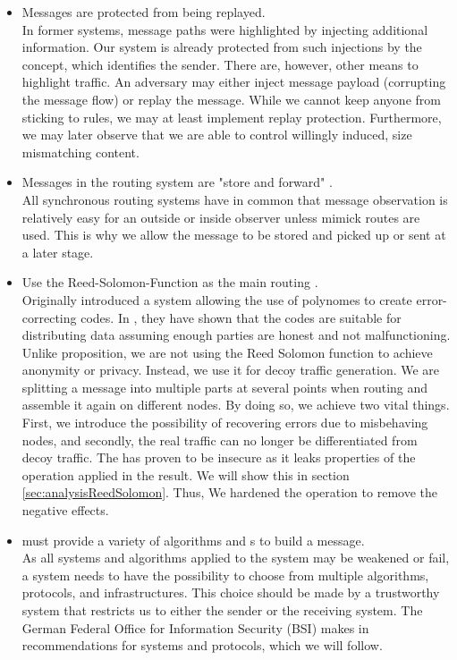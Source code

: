 \begin{itemize}
	\item Messages are protected from being replayed.\\
	In former systems, message paths were highlighted by injecting additional information. Our system is already protected from such injections by the  concept, which identifies the sender. There are, however, other means to highlight traffic. An adversary may either inject message payload (corrupting the message flow) or replay the message. While we cannot keep anyone from sticking to rules, we may at least implement replay protection. Furthermore, we may later observe that we are able to control willingly induced, size mismatching content.
	\item Messages in the routing system are "store and forward" .\\
	All synchronous routing systems have in common that message observation is relatively easy for an outside or inside observer unless mimick routes are used. This is why we allow the message to be stored and picked up or sent at a later stage. 
	\item Use the Reed-Solomon-Function as the main routing .\\
	Originally \cite{reed1960polynomial} introduced a system allowing the use of polynomes to create error-correcting codes. In \cite{chaum1988multiparty} \citeauthor{chaum1988multiparty}, they have shown that the codes are suitable for distributing data assuming enough parties are honest and not malfunctioning. Unlike \citeauthor{chaum1988multiparty} proposition, we are not using the Reed Solomon function to achieve anonymity or privacy. Instead, we use it for decoy traffic generation. We are splitting a message into multiple parts at several points when routing and assemble it again on different nodes. By doing so, we achieve two vital things. First, we introduce the possibility of recovering errors due to misbehaving nodes, and secondly, the real traffic can no longer be differentiated from decoy traffic. The  has proven to be insecure as it leaks properties of the operation applied in the result. We will show this in section \ref{sec:analysisReedSolomon}. Thus, We hardened the operation to remove the negative effects.
	\item \MessageVortex{} must provide a variety of algorithms and s to build a message.\\        
	As all systems and algorithms applied to the system may be weakened or fail, a system needs to have the possibility to choose from multiple algorithms, protocols, and infrastructures. This choice should be made by a trustworthy system that restricts us to either the sender or the receiving system. The German Federal Office for Information Security (BSI) makes in \cite{bsiPostQuantum} recommendations for systems and protocols, which we will follow.
	

\end{itemize}
